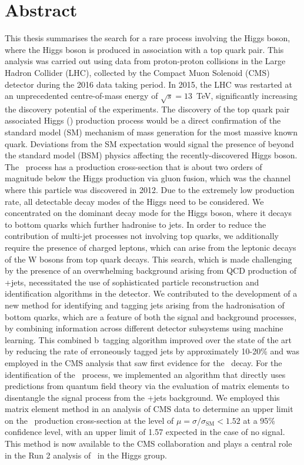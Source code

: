 \chapter*{Abstract}
This thesis summarises the search for a rare process involving the Higgs boson, where the Higgs boson is produced in association with a top quark pair. This analysis was carried out using data from proton-proton collisions in the Large Hadron Collider (LHC), collected by the Compact Muon Solenoid (CMS) detector during the 2016 data taking period. In 2015, the LHC was restarted at an unprecedented centre-of-mass energy of $\sqrt{s}=13$~TeV, significantly increasing the discovery potential of the experiments. The discovery of the top quark pair associated Higgs (\ttH) production process would be a direct confirmation of the standard model (SM) mechanism of mass generation for the most massive known quark. Deviations from the SM expectation would signal the presence of beyond the standard model (BSM) physics affecting the recently-discovered Higgs boson. The \ttH~process has a production cross-section that is about two orders of magnitude below the Higgs production via gluon fusion, which was the channel where this particle was discovered in 2012. Due to the extremely low production rate, all detectable decay modes of the Higgs need to be considered. We concentrated on the dominant decay mode for the Higgs boson, where it decays to bottom quarks which further hadronise to jets. In order to reduce the contribution of multi-jet processes not involving top quarks, we additionally require the presence of charged leptons, which can arise from the leptonic decays of the W bosons from top quark decays. This search, which is made challenging by the presence of an overwhelming background arising from QCD production of \ttbar+jets, necessitated the use of sophisticated particle reconstruction and identification algorithms in the detector. We contributed to the development of a new method for identifying and tagging jets arising from the hadronisation of bottom quarks, which are a feature of both the signal and background processes, by combining information across different detector subsystems using machine learning. This combined b~tagging algorithm improved over the state of the art by reducing the rate of erroneously tagged jets by approximately 10-20\% and was employed in the CMS analysis that saw first evidence for the \Hbb~decay. For the identification of the \ttH~process, we implemented an algorithm that directly uses predictions from quantum field theory via the evaluation of matrix elements to disentangle the signal process from the \ttbar+jets background. We employed this matrix element method in an analysis of CMS data to determine an upper limit on the \ttH~production cross-section at the level of $\mu=\sigma/\sigma_{\mathrm{SM}} < 1.52$ at a 95\% confidence level, with an upper limit of 1.57 expected in the case of no signal. This method is now available to the CMS collaboration and plays a central role in the Run 2 analysis of \ttHbb~in the Higgs group.

